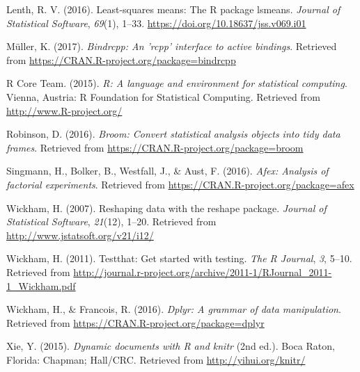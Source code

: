 \documentclass[
  man,floatsintext]{apa6}
\begin{document}
\begin{CSLReferences}
Lenth, R. V. (2016). Least-squares means: The {R} package {lsmeans}. \emph{Journal of Statistical Software}, \emph{69}(1), 1--33. \url{https://doi.org/10.18637/jss.v069.i01}

Müller, K. (2017). \emph{Bindrcpp: An 'rcpp' interface to active bindings}. Retrieved from \url{https://CRAN.R-project.org/package=bindrcpp}

R Core Team. (2015). \emph{R: A language and environment for statistical computing}. Vienna, Austria: R Foundation for Statistical Computing. Retrieved from \url{http://www.R-project.org/}

Robinson, D. (2016). \emph{Broom: Convert statistical analysis objects into tidy data frames}. Retrieved from \url{https://CRAN.R-project.org/package=broom}

Singmann, H., Bolker, B., Westfall, J., \& Aust, F. (2016). \emph{Afex: Analysis of factorial experiments}. Retrieved from \url{https://CRAN.R-project.org/package=afex}

Wickham, H. (2007). Reshaping data with the {reshape} package. \emph{Journal of Statistical Software}, \emph{21}(12), 1--20. Retrieved from \url{http://www.jstatsoft.org/v21/i12/}

Wickham, H. (2011). Testthat: Get started with testing. \emph{The R Journal}, \emph{3}, 5--10. Retrieved from \url{http://journal.r-project.org/archive/2011-1/RJournal_2011-1_Wickham.pdf}

Wickham, H., \& Francois, R. (2016). \emph{Dplyr: A grammar of data manipulation}. Retrieved from \url{https://CRAN.R-project.org/package=dplyr}

Xie, Y. (2015). \emph{Dynamic documents with {R} and knitr} (2nd ed.). Boca Raton, Florida: Chapman; Hall/CRC. Retrieved from \url{http://yihui.org/knitr/}

\end{CSLReferences}
\end{document}
